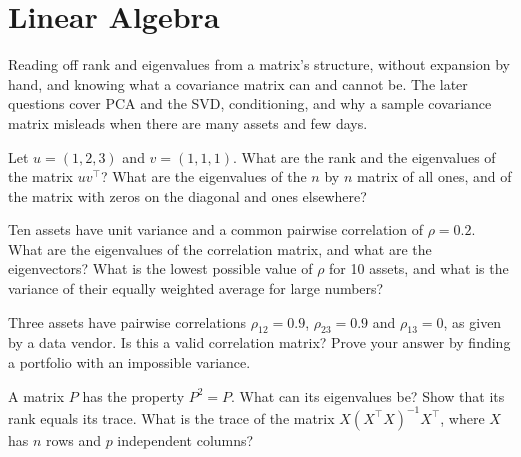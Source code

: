 \chapter{Linear Algebra}\label{ch:iv1:linear-algebra}

\begin{ivtrains}
Reading off rank and eigenvalues from a matrix's structure, without expansion by hand, and knowing what a covariance matrix can and cannot be. The later questions cover PCA and the SVD, conditioning, and why a sample covariance matrix misleads when there are many assets and few days.
\end{ivtrains}

\begin{question}\label{iq:iv1:linear-algebra:1}
Let $u = (1, 2, 3)$ and $v = (1, 1, 1)$. What are the rank and the eigenvalues of the matrix $uv^\top$? What are the eigenvalues of the $n$ by $n$ matrix of all ones, and of the matrix with zeros on the diagonal and ones elsewhere?
\end{question}

\begin{question}\label{iq:iv1:linear-algebra:2}
Ten assets have unit variance and a common pairwise correlation of $\rho = 0.2$. What are the eigenvalues of the correlation matrix, and what are the eigenvectors? What is the lowest possible value of $\rho$ for 10 assets, and what is the variance of their equally weighted average for large numbers?
\end{question}

\begin{question}\label{iq:iv1:linear-algebra:3}
Three assets have pairwise correlations $\rho_{12} = 0.9$, $\rho_{23} = 0.9$ and $\rho_{13} = 0$, as given by a data vendor. Is this a valid correlation matrix? Prove your answer by finding a portfolio with an impossible variance.
\end{question}

\begin{question}\label{iq:iv1:linear-algebra:4}
A matrix $P$ has the property $P^2 = P$. What can its eigenvalues be? Show that its rank equals its trace. What is the trace of the matrix $X(X^\top X)^{-1}X^\top$, where $X$ has $n$ rows and $p$ independent columns?
\end{question}

